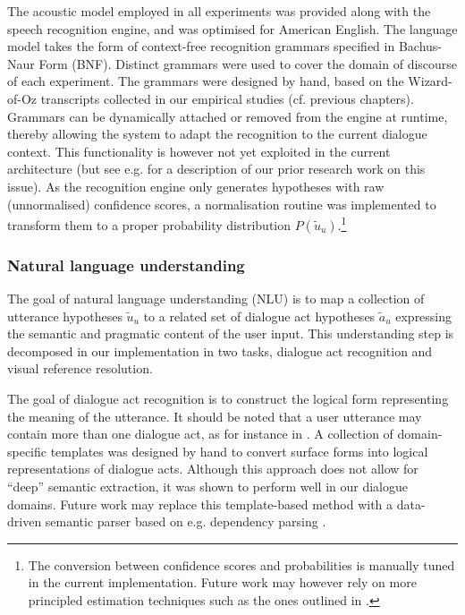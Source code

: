 The acoustic model employed in all experiments was provided along with the speech recognition engine, and was optimised for American English. The language model takes the form of context-free recognition grammars specified in Bachus-Naur Form (BNF). Distinct grammars were used to cover the domain of discourse of each experiment. The grammars were designed by hand, based on the Wizard-of-Oz transcripts collected in our empirical studies (cf. previous chapters). Grammars can be dynamically attached or removed from the engine at runtime, thereby allowing the system to adapt the recognition to the current dialogue context. This functionality is however not yet exploited in the current architecture (but see e.g. \cite{ESSLLI2008-springerreprint} for a description of our prior research work on this issue). As the recognition engine only generates hypotheses with raw (unnormalised) confidence scores, a normalisation routine was implemented to transform them to a proper probability distribution $P(\tilde{u}_u)$.\footnote{The conversion between confidence scores and probabilities is manually tuned in the current implementation.  Future work may however rely on more principled estimation techniques such as the ones outlined in \cite{Williams08}.}


\subsubsection*{Natural language understanding}

The goal of natural language understanding (NLU) is to map a collection of utterance hypotheses $\tilde{u}_u$ to a related set of dialogue act hypotheses $\tilde{a}_u$ expressing the semantic and pragmatic content of the user input. This understanding step is decomposed in our implementation in two tasks, dialogue act recognition and visual reference resolution.  

The goal of dialogue act recognition is to construct the logical form representing the meaning of the utterance. It should be noted that a user utterance may contain more than one dialogue act, as for instance in .  A collection of domain-specific templates was designed by hand to convert surface forms into logical representations of dialogue acts.  Although this approach does not allow for ``deep'' semantic extraction, it was shown to perform well in our dialogue domains. Future work may replace this template-based method with a data-driven semantic parser based on e.g.  dependency parsing \citep{Nivre:Etal07}.  

